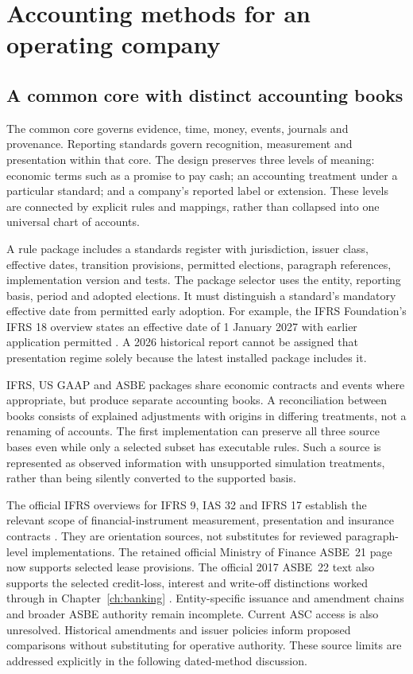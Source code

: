 \chapter{Accounting methods for an operating company}
\label{ch:modules}

\section{A common core with distinct accounting books}

The common core governs evidence, time, money, events, journals and provenance.
Reporting standards govern recognition, measurement and presentation within
that core. The design preserves three levels of meaning: economic terms such
as a promise to pay cash; an accounting treatment under a particular standard;
and a company's reported label or extension. These levels are connected by
explicit rules and mappings, rather than collapsed into one universal chart
of accounts.

A rule package includes a standards register with jurisdiction, issuer class,
effective dates, transition provisions, permitted elections, paragraph
references, implementation version and tests. The package selector uses the
entity, reporting basis, period and adopted elections. It must distinguish a
standard's mandatory effective date from permitted early adoption. For example,
the IFRS Foundation's IFRS 18 overview states an effective date of 1 January
2027 with earlier application permitted \citep{ifrs18}. A 2026 historical
report cannot be assigned that presentation regime solely because the latest
installed package includes it.

IFRS, US GAAP and ASBE packages share economic contracts and events where
appropriate, but produce separate accounting books. A reconciliation between
books consists of explained adjustments with origins in differing treatments,
not a renaming of accounts. The first implementation can preserve all three
source bases even while only a selected subset has executable rules. Such a
source is represented as observed information with unsupported simulation
treatments, rather than being silently converted to the supported basis.

The official IFRS overviews for IFRS 9, IAS 32 and IFRS 17 establish the relevant
scope of financial-instrument measurement, presentation and insurance
contracts \citep{ifrs9,ias32,ifrs17}. They are orientation sources, not substitutes
for reviewed paragraph-level implementations. The retained official Ministry of Finance ASBE~21 page now supports selected
lease provisions. The official 2017 ASBE~22 text also supports the selected
credit-loss, interest and write-off distinctions worked through in
Chapter~\ref{ch:banking} \citep{mofasbe22}. Entity-specific issuance and amendment
chains and broader ASBE authority remain incomplete. Current ASC access is also
unresolved.
Historical amendments and issuer policies inform proposed comparisons without
substituting for operative authority. These source limits are addressed
explicitly in the following dated-method discussion.


